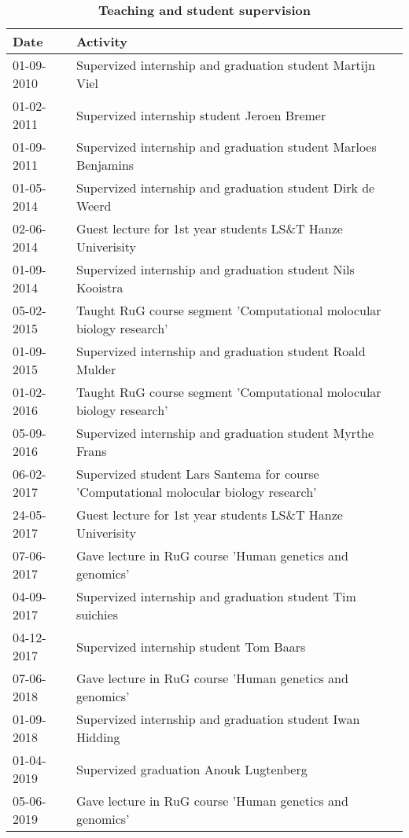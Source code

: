 \begin{appendices}
	\begin{table}
		\caption*{\textbf{Teaching and student supervision}}
		\footnotesize
		\begin{tabulary}{\linewidth}{LL}
			Date & Activity \\
			\hline		
			\rule{0pt}{2.6ex}\mbox{01-09-2010 } & Supervized internship and graduation student Martijn Viel\\
			\rule{0pt}{2.6ex}\mbox{01-02-2011 } & Supervized internship student Jeroen Bremer \\
			\rule{0pt}{2.6ex}\mbox{01-09-2011 } & Supervized internship and graduation student Marloes Benjamins \\
			\rule{0pt}{2.6ex}\mbox{01-05-2014 } & Supervized internship and graduation student Dirk de Weerd \\
			\rule{0pt}{2.6ex}\mbox{02-06-2014 } & Guest lecture for 1st year students LS\&T Hanze Univerisity \\
			\rule{0pt}{2.6ex}\mbox{01-09-2014 } & Supervized internship and graduation student Nils Kooistra \\
			\rule{0pt}{2.6ex}\mbox{05-02-2015 } & Taught RuG course segment 'Computational molocular biology research'\\
			\rule{0pt}{2.6ex}\mbox{01-09-2015 } & Supervized internship and graduation student Roald Mulder \\
			\rule{0pt}{2.6ex}\mbox{01-02-2016 } & Taught RuG course segment 'Computational molocular biology research' \\
			\rule{0pt}{2.6ex}\mbox{05-09-2016 } & Supervized internship and graduation student Myrthe Frans\\
			\rule{0pt}{2.6ex}\mbox{06-02-2017 } & Supervized student Lars Santema for course 'Computational molocular biology research' \\
			\rule{0pt}{2.6ex}\mbox{24-05-2017 } & Guest lecture for 1st year students LS\&T Hanze Univerisity \\
			\rule{0pt}{2.6ex}\mbox{07-06-2017 } & Gave lecture in RuG course 'Human genetics and genomics' \\
			\rule{0pt}{2.6ex}\mbox{04-09-2017 } & Supervized internship and graduation student Tim suichies \\
			\rule{0pt}{2.6ex}\mbox{04-12-2017 } & Supervized internship student Tom Baars\\
			\rule{0pt}{2.6ex}\mbox{07-06-2018 } & Gave lecture in RuG course 'Human genetics and genomics' \\
			\rule{0pt}{2.6ex}\mbox{01-09-2018 } & Supervized internship and graduation student Iwan Hidding\\
			\rule{0pt}{2.6ex}\mbox{01-04-2019 } & Supervized graduation Anouk Lugtenberg \\
			\rule{0pt}{2.6ex}\mbox{05-06-2019 } & Gave lecture in RuG course 'Human genetics and genomics' \\
			\hline
		\end{tabulary}
		\label{table:appendix_activities_4}
	\end{table}
	

\end{appendices}

